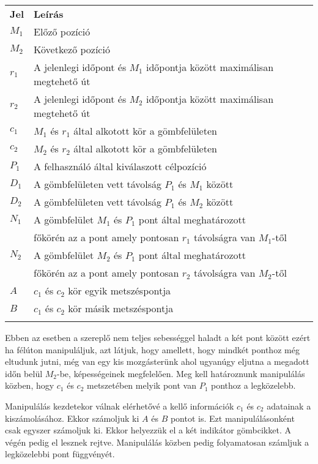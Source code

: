 \begin{tabular}{@{}ll@{}}
	\textbf{Jel} & \textbf{Leírás} \\
	$M_1$ & Előző pozíció \\
	$M_2$ & Következő pozíció \\
	$r_1$ & A jelenlegi időpont és $M_1$ időpontja között maximálisan megtehető út \\
	$r_2$ & A jelenlegi időpont és $M_2$ időpontja között maximálisan megtehető út \\
	$c_1$ & $M_1$ és $r_1$ által alkotott kör a gömbfelületen \\
	$c_2$ & $M_2$ és $r_2$ által alkotott kör a gömbfelületen \\
	$P_1$ & A felhasználó által kiválaszott célpozíció \\
	$D_1$ & A gömbfelületen vett távolság $P_1$ és $M_1$ között \\
	$D_2$ & A gömbfelületen vett távolság $P_1$ és $M_2$ között \\
	$N_1$ & A gömbfelület $M_1$ és $P_1$ pont által meghatározott \\
	& főkörén az a pont amely pontosan $r_1$ távolságra van $M_1$-től \\
	$N_2$ & A gömbfelület $M_2$ és $P_1$ pont által meghatározott \\
	& főkörén az a pont amely pontosan $r_2$ távolságra van $M_2$-től \\
	$A$ & $c_1$ és $c_2$ kör egyik metszéspontja \\
	$B$ & $c_1$ és $c_2$ kör másik metszéspontja \\
	& \\
\end{tabular}

Ebben az esetben a szereplő nem teljes sebességgel haladt a két pont között ezért ha félúton manipuláljuk, azt látjuk, hogy amellett, hogy mindkét ponthoz még eltudunk jutni, még van egy kis mozgásterünk ahol ugyanúgy eljutna a megadott időn belül $M_2$-be, képességeinek megfelelően. Meg kell határoznunk manipulálás közben, hogy $c_1$ és $c_2$ metszetében melyik pont van $P_1$ ponthoz a legközelebb.

Manipulálás kezdetekor válnak elérhetővé a kellő információk $c_1$ és $c_2$ adatainak a kiszámolásához. Ekkor számoljuk ki $A$ és $B$ pontot is. Ezt manipulálásonként csak egyszer számoljuk ki. Ekkor helyezzük el a két indikátor gömbcikket. A végén pedig el lesznek rejtve. Manipulálás közben pedig folyamatosan számljuk a legközelebbi pont függvényét.

